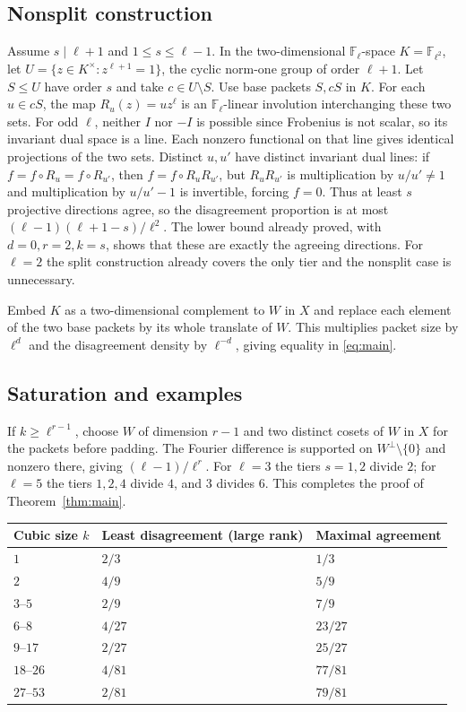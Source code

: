 \documentclass[11pt]{article}
\theoremstyle{remark}\newtheorem{remark}[theorem]{Remark}
\newcommand{\F}{\mathbb F}
\begin{document}
\subsection{Nonsplit construction}
Assume $s\mid\ell+1$ and $1\le s\le\ell-1$. In the two-dimensional $\F_\ell$-space $K=\F_{\ell^2}$, let $U=\{z\in K^\times:z^{\ell+1}=1\}$, the cyclic norm-one group of order $\ell+1$. Let $S\le U$ have order $s$ and take $c\in U\setminus S$. Use base packets $S,cS$ in $K$. For each $u\in cS$, the map $R_u(z)=u z^\ell$ is an $\F_\ell$-linear involution interchanging these two sets. For odd $\ell$, neither $I$ nor $-I$ is possible since Frobenius is not scalar, so its invariant dual space is a line. Each nonzero functional on that line gives identical projections of the two sets. Distinct $u,u'$ have distinct invariant dual lines: if $f=f\circ R_u=f\circ R_{u'}$, then $f=f\circ R_uR_{u'}$, but $R_uR_{u'}$ is multiplication by $u/u'\ne1$ and multiplication by $u/u'-1$ is invertible, forcing $f=0$. Thus at least $s$ projective directions agree, so the disagreement proportion is at most $(\ell-1)(\ell+1-s)/\ell^2$. The lower bound already proved, with $d=0,r=2,k=s$, shows that these are exactly the agreeing directions. For $\ell=2$ the split construction already covers the only tier and the nonsplit case is unnecessary.

Embed $K$ as a two-dimensional complement to $W$ in $X$ and replace each element of the two base packets by its whole translate of $W$. This multiplies packet size by $\ell^d$ and the disagreement density by $\ell^{-d}$, giving equality in \eqref{eq:main}.

\subsection{Saturation and examples}
If $k\ge\ell^{r-1}$, choose $W$ of dimension $r-1$ and two distinct cosets of $W$ in $X$ for the packets before padding. The Fourier difference is supported on $W^\perp\setminus\{0\}$ and nonzero there, giving $(\ell-1)/\ell^r$. For $\ell=3$ the tiers $s=1,2$ divide $2$; for $\ell=5$ the tiers $1,2,4$ divide $4$, and $3$ divides $6$. This completes the proof of Theorem~\ref{thm:main}.

\begin{center}
\begin{tabular}{@{}lll@{}}\toprule
Cubic size $k$ & Least disagreement (large rank) & Maximal agreement\\\midrule
$1$ & $2/3$ & $1/3$\\
$2$ & $4/9$ & $5/9$\\
$3$--$5$ & $2/9$ & $7/9$\\
$6$--$8$ & $4/27$ & $23/27$\\
$9$--$17$ & $2/27$ & $25/27$\\
$18$--$26$ & $4/81$ & $77/81$\\
$27$--$53$ & $2/81$ & $79/81$\\\bottomrule
\end{tabular}
\end{center}
\end{document}
